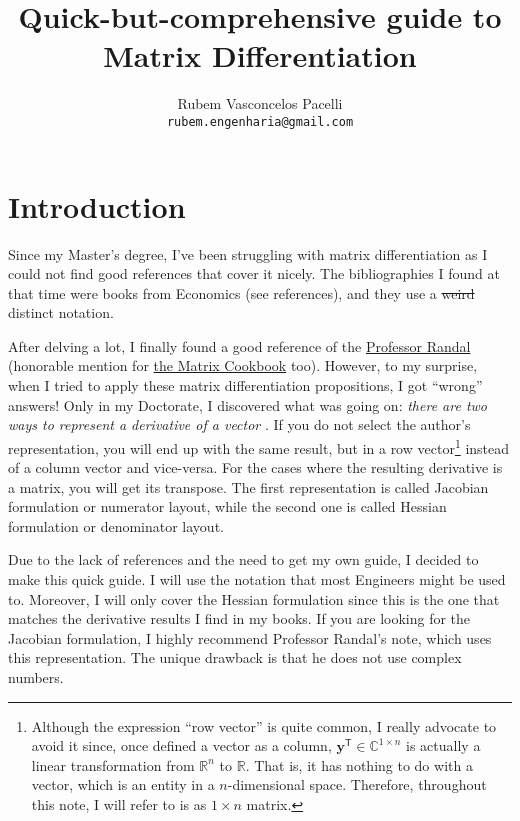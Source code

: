 \documentclass{article}
\title{\textbf{Quick-but-comprehensive guide to Matrix Differentiation}  \vspace{-.3cm}}
\author{Rubem Vasconcelos Pacelli\\
  {\tt rubem.engenharia@gmail.com}}
\affil{Department of Teleinformatics Engineering, Federal University of Ceará.\\Fortaleza, Ceará, Brazil. \vspace{-.5cm}}
\newcommand{\trans}{\mathsf{T}}
\begin{document}
\maketitle
\tableofcontents

\section{Introduction}
Since my Master's degree, I've been struggling with matrix differentiation as I could not find good references that cover it nicely. The bibliographies I found at that time were books from Economics (see references), and they use a \st{weird} distinct notation.

After delving a lot, I finally found a good reference of the \href{https://atmos.washington.edu/~dennis/MatrixCalculus.pdf}{Professor Randal} (honorable mention for \href{https://www.math.uwaterloo.ca/~hwolkowi/matrixcookbook.pdf}{the Matrix Cookbook} too). However, to my surprise, when I tried to apply these matrix differentiation propositions, I got ``wrong'' answers! Only in my Doctorate, I discovered what was going on: \emph{there are two ways to represent a derivative of a vector} \cite{Singh}. If you do not select the author's representation, you will end up with the same result, but in a row vector\footnote{Although the expression ``row vector'' is quite common, I really advocate to avoid it since, once defined a vector as a column, \(\mathbf{y}^{\trans} \in \mathbb{C}^{1\times n}\) is actually a linear transformation from \(\mathbb{R}^{n}\) to \(\mathbb{R}\). That is, it has nothing to do with a vector, which is an entity in a \(n\)-dimensional space. Therefore, throughout this note, I will refer to is as \(1\times n\) matrix.} instead of a column vector and vice-versa. For the cases where the resulting derivative is a matrix, you will get its transpose. The first representation is called Jacobian formulation or numerator layout, while the second one is called Hessian formulation or denominator layout.

Due to the lack of references and the need to get my own guide, I decided to make this quick guide. I will use the notation that most Engineers might be used to. Moreover, I will only cover the Hessian formulation since this is the one that matches the derivative results I find in my books. If you are looking for the Jacobian formulation, I highly recommend Professor Randal's note, which uses this representation. The unique drawback is that he does not use complex numbers.
\end{document}
